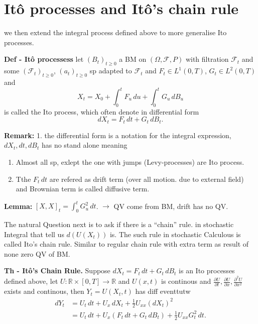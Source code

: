 \documentclass[
  letterpaper,
  DIV=11,
  numbers=noendperiod]{scrreprt}
\theoremstyle{definition}
\theoremstyle{plain}
\theoremstyle{plain}
\theoremstyle{definition}
\theoremstyle{plain}
\theoremstyle{plain}
\theoremstyle{remark}
\begin{document}
\section{Itô processes and Itô's chain
rule}\label{ituxf4-processes-and-ituxf4s-chain-rule}

we then extend the integral process defined above to more generalise Ito
processes.

\textbf{Def - Itô processess} let \((B_t)_{t \geq 0}\) a BM on
\((\Omega, \mathcal{F}, P)\) with filtration \(\mathcal{F}_t\) and some
\((\mathcal{F}_t)_{t \geq 0}\), \((a_t)_{t \geq 0}\) sp adapted to
\(\mathcal{F}_t\) and \(F_t \in L^1(0,T)\), \(G_t \in L^2(0,T)\) and \[
X_t = X_0 + \int_0^t F_u \, du + \int_0^t G_u \, dB_u
\] is called the Ito process, which often denote in differential form \[
dX_t = F_t \, dt + G_t \, dB_t.
\]

\textbf{Remark:} 1. the differential form is a notation for the integral
expression, \(dX_t, dt, dB_t\) has no stand alone meaning

\begin{enumerate}
\def\labelenumi{\arabic{enumi}.}
\setcounter{enumi}{1}
\item
  Almost all sp, exlept the one with jumps (Levy-processes) are Ito
  process.
\item
  Tthe \(F_t \, dt\) are refered as drift term (over all motion. due to
  external field) and Brownian term is called diffusive term.
\end{enumerate}

\textbf{Lemma:} \([X, X]_t = \int_0^t G_u^2 \, dt\). \(\to\) QV come
from BM, drift has no QV.

The natural Question next is to ask if there is a ``chain'' rule. in
stochastic Integral that tell us \(d(U(X_t))\) is. The such rule in
stochastic Calculous is called Ito's chain rule. Similar to regular
chain rule with extra term as result of none zero QV of BM.

\textbf{Th - Itô's Chain Rule.} Suppose
\(dX_t = F_t \, dt + G_t \, dB_t\) is an Ito processes defined above,
let \(U: \mathbb{R} \times [0,T] \to \mathbb{R}\) and \(U(x,t)\) is
continous and
\(\frac{\partial U}{\partial t}, \frac{\partial U}{\partial x}, \frac{\partial^2 U}{\partial x^2}\)
exists and continous, then \(Y_t = U(X_t, t)\) has diff eventtutw \[
\begin{aligned}
dY_t &= U_t \, dt + U_x \, dX_t + \tfrac12 U_{xx}(dX_t)^2 \\
&= U_t \, dt + U_x(F_t \, dt + G_t \, dB_t) + \tfrac12 U_{xx} G_t^2 \, dt.
\end{aligned}
\]
\end{document}
